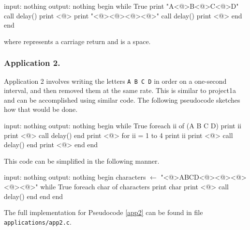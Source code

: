 \documentclass[letterpaper, 12pt]{article}
\begin{document}
\begin{pseudocode}[caption={Application 1 pseudocode.}, label={app1}]
 input: nothing
 output: nothing
 begin
   while True
     print "A<@\textvisiblespace@>B<@\textvisiblespace@>C<@\textvisiblespace@>D"
     call delay()
     print <@\return@>
     print "<@\textvisiblespace@><@\textvisiblespace@><@\textvisiblespace@><@\textvisiblespace@>"
     call delay()
     print <@\return@>
   end
 end
\end{pseudocode}

\noindent where \return{} represents a carriage return and \textvisiblespace{} is a space.

\subsubsection{Application 2.}

Application 2 involves writing the letters \verb+A B C D+ in order on a one-second interval, and then removed them at the same rate. This is similar to project1a and can be accomplished using similar code. The following pseudocode sketches how that would be done.

\begin{pseudocode}[caption={Application 2 pseudocode (not implemented).}, label={app2_notused}]
 input: nothing
 output: nothing
 begin
    while True
        foreach ii of (A B C D)
            print ii
            print <@\textvisiblespace@>
            call delay()
        end
        print <@\return@>
        for ii = 1 to 4
            print ii
            print <@\textvisiblespace@>
            call delay()
        end
        print <@\return@>
    end
 end
\end{pseudocode}

This code can be simplified in the following manner.

\begin{pseudocode}[caption={Application 2 pseudocode (implemented).}, label={app2}]
 input: nothing
 output: nothing
 begin
    characters $\gets$ "<@\return@>ABCD<@\return@><@\textvisiblespace@><@\textvisiblespace@><@\textvisiblespace@><@\textvisiblespace@>"
    while True
        foreach char of characters
            print char
            print <@\textvisiblespace@>
            call delay()
        end
    end
 end
\end{pseudocode}

The full implementation for Pseudocode \ref{app2} can be found in file \verb+applications/app2.c+.
\end{document}
